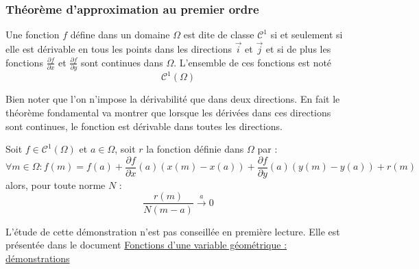 \subsubsection{Théorème d'approximation au premier ordre}
\begin{defi}
 Une fonction $f$ défine dans un domaine $\Omega$ est dite de classe $\mathcal C^1$ si et seulement si elle est dérivable en tous les points dans les directions $\overrightarrow i$ et $\overrightarrow j$ et si de plus les fonctions $\frac{\partial f}{\partial x}$ et $\frac{\partial f}{\partial y}$ sont continues dans $\Omega$. L'ensemble de ces fonctions est noté 
\begin{displaymath}
 \mathcal C^1 (\Omega)
\end{displaymath}
\end{defi}
 \begin{rem}
  Bien noter que l'on n'impose la dérivabilité que dans deux directions. En fait le théorème fondamental va montrer que lorsque les dérivées dans ces directions sont continues, le fonction est dérivable dans toutes les directions.
 \end{rem}
\begin{thm}
 Soit $f\in \mathcal C^1(\Omega)$ et $a\in \Omega$, soit $r$ la fonction définie dans $\Omega$ par :
\begin{displaymath}
 \forall m \in \Omega :
f(m) = f(a) +\dfrac{\partial f}{\partial x}(a)(x(m)-x(a))
+\dfrac{\partial f}{\partial y}(a)(y(m)-y(a)) +r(m)
\end{displaymath}
alors, pour toute norme $N$ :
\begin{displaymath}
 \dfrac{r(m)}{N(m-a)} \xrightarrow{a} 0
\end{displaymath}
\end{thm}
\begin{demo}
 L'étude de cette démonstration n'est pas conseillée en première lecture. Elle est présentée dans le document \href{\baseurl C6308.pdf}{Fonctions d'une variable géométrique : démonstrations} 
\end{demo}
